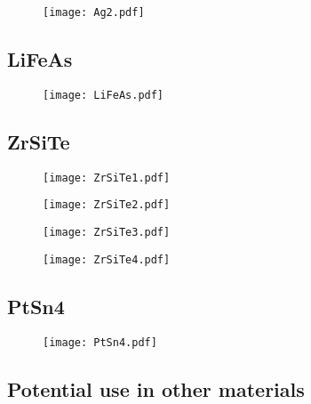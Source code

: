 \begin{figure}
	\texttt{[image: Ag2.pdf]} 
	\centering
	\caption{}
	\label{fig:Ag2}
\end{figure}

\subsection{LiFeAs}
\begin{figure}
	\texttt{[image: LiFeAs.pdf]} 
	\centering
	\caption{}
	\label{fig:LiFeAs}
\end{figure}
\subsection{ZrSiTe}
\begin{figure}
	\texttt{[image: ZrSiTe1.pdf]} 
	\centering
	\caption{}
	\label{fig:ZrSiTe1}
\end{figure}

\begin{figure}
	\texttt{[image: ZrSiTe2.pdf]} 
	\centering
	\caption{}
	\label{fig:ZrSiTe2}
\end{figure}

\begin{figure}
	\texttt{[image: ZrSiTe3.pdf]} 
	\centering
	\caption{}
	\label{fig:ZrSiTe3}
\end{figure}

\begin{figure}
	\texttt{[image: ZrSiTe4.pdf]} 
	\centering
	\caption{}
	\label{fig:ZrSiTe4}
\end{figure}

\subsection{PtSn4}
\begin{figure}
	\texttt{[image: PtSn4.pdf]} 
	\centering
	\caption{}
	\label{fig:PtSn4}
\end{figure}
\subsection{Potential use in other materials}
